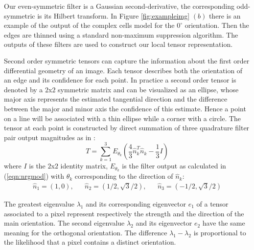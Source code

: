 \documentclass{llncs}
\begin{document}
Our even-symmetric filter is
a Gaussian second-derivative, the corresponding odd-symmetric is its
Hilbert transform.
In Figure \ref{fig:exampleimg} $(b)$ there is an example of the output of the
complex cells model for the $0^\circ$ orientation.
Then the edges are thinned using a standard non-maximum
suppression algorithm.
The outputs of these filters are used to construct our local tensor
representation.

Second order symmetric tensors can capture the information about the first
order differential geometry of an image. Each tensor describes both the
orientation of an edge and its confidence for each point.
In practice a second order tensor is denoted by a $2$x$2$ symmetric matrix
and can be visualized as an ellipse, whose major axis represents the estimated tangential
direction and the difference between the major and minor axis the confidence
of this estimate. Hence a point on a line will be associated with a thin
ellipse while a corner with a circle.
The tensor at each point is constructed by direct summation of three quadrature filter pair output magnitudes as in \cite{Knutsson89}:
\begin{equation} \label{eqn:sumquad}
T=\sum^3_{k=1}E_{\theta_k}\left(\frac{4}{3}\hat{n}_k^T \hat{n}_k-\frac{1}{3}I\right)
\end{equation}
where $I$ is the $2$x$2$ identity matrix, $E_{\theta_k}$ is the filter output
as calculated in (\ref{eqn:nrgmod}) with $\theta_k$  corresponding to the
direction of $\hat{n}_k$:
\begin{equation} \label{eqn:fildir}
\begin{array}{ccccc}
\hat{n}_1=\left(1,0\right), &  &
\hat{n}_2=\left(1/2,\sqrt{3}/2\right), &  &
\hat{n}_3=\left(-1/2,\sqrt{3}/2\right)
\end{array}
\end{equation}

The greatest eigenvalue $\lambda_1$ and its corresponding eigenvector $e_1$ of
a tensor associated to a pixel represent respectively the strength and the
direction of the main orientation. The second eigenvalue $\lambda_2$ and its
eigenvector $e_2$ have the same meaning for the orthogonal orientation.
The difference $\lambda_1-\lambda_2$ is proportional to the likelihood that a
pixel contains a distinct orientation.
\end{document}
